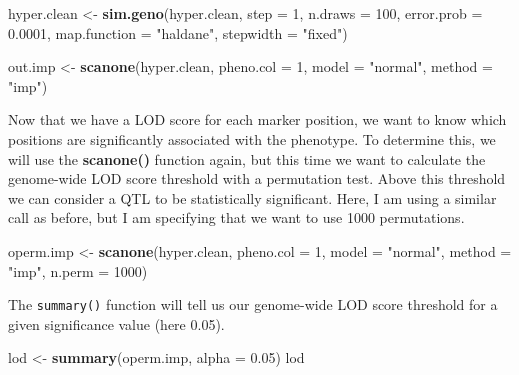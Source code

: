 \documentclass[12pt,]{krantz}
\newenvironment{Shaded}{\begin{snugshade}}{\end{snugshade}}
\newcommand{\KeywordTok}[1]{\textcolor[rgb]{0.27,0.27,0.27}{\textbf{#1}}}
\newcommand{\DataTypeTok}[1]{\textcolor[rgb]{0.27,0.27,0.27}{#1}}
\newcommand{\DecValTok}[1]{\textcolor[rgb]{0.06,0.06,0.06}{#1}}
\newcommand{\FloatTok}[1]{\textcolor[rgb]{0.06,0.06,0.06}{#1}}
\newcommand{\StringTok}[1]{\textcolor[rgb]{0.5,0.5,0.5}{#1}}
\newcommand{\NormalTok}[1]{#1}
\theoremstyle{definition}
\theoremstyle{definition}
\theoremstyle{definition}
\theoremstyle{remark}
\begin{document}
\begin{Shaded}
\begin{Highlighting}[]
\NormalTok{hyper.clean <-}\StringTok{ }\KeywordTok{sim.geno}\NormalTok{(hyper.clean, }\DataTypeTok{step =} \DecValTok{1}\NormalTok{, }\DataTypeTok{n.draws =} \DecValTok{100}\NormalTok{, }
                        \DataTypeTok{error.prob =} \FloatTok{0.0001}\NormalTok{, }
                        \DataTypeTok{map.function =} \StringTok{"haldane"}\NormalTok{, }
                        \DataTypeTok{stepwidth =} \StringTok{"fixed"}\NormalTok{)}

\NormalTok{out.imp <-}\StringTok{ }\KeywordTok{scanone}\NormalTok{(hyper.clean, }\DataTypeTok{pheno.col =} \DecValTok{1}\NormalTok{, }\DataTypeTok{model =} \StringTok{"normal"}\NormalTok{, }
                   \DataTypeTok{method =} \StringTok{"imp"}\NormalTok{)}
\end{Highlighting}
\end{Shaded}

Now that we have a LOD score for each marker position, we want to know
which positions are significantly associated with the phenotype. To
determine this, we will use the \textbf{scanone()} function again, but
this time we want to calculate the genome-wide LOD score threshold with
a permutation test. Above this threshold we can consider a QTL to be
statistically significant. Here, I am using a similar call as before,
but I am specifying that we want to use 1000 permutations.

\begin{Shaded}
\begin{Highlighting}[]
\NormalTok{operm.imp <-}\StringTok{ }\KeywordTok{scanone}\NormalTok{(hyper.clean, }\DataTypeTok{pheno.col =} \DecValTok{1}\NormalTok{, }\DataTypeTok{model =} \StringTok{"normal"}\NormalTok{, }
                     \DataTypeTok{method =} \StringTok{"imp"}\NormalTok{, }\DataTypeTok{n.perm =} \DecValTok{1000}\NormalTok{)}
\end{Highlighting}
\end{Shaded}

The \texttt{summary()} function will tell us our genome-wide LOD score
threshold for a given significance value (here 0.05).

\begin{Shaded}
\begin{Highlighting}[]
\NormalTok{lod <-}\StringTok{ }\KeywordTok{summary}\NormalTok{(operm.imp, }\DataTypeTok{alpha =} \FloatTok{0.05}\NormalTok{)}
\NormalTok{lod}
\end{Highlighting}
\end{Shaded}
\end{document}
